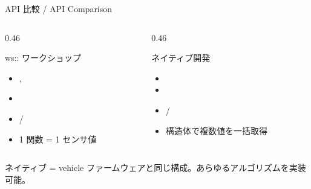 \begin{frame}[fragile]{API 比較 / API Comparison}
  \begin{columns}[t]
    \begin{column}{0.46\textwidth}
      \begin{exampleblock}{ws:: ワークショップ}
        {\scriptsize
        \begin{itemize}
          \item {}, 
          \item {}
          \item {} / 
          \item 1 関数 = 1 センサ値
        \end{itemize}
        }
      \end{exampleblock}
    \end{column}
    \begin{column}{0.46\textwidth}
      \begin{block}{ネイティブ開発}
        {\scriptsize
        \begin{itemize}
          \item {}
          \item {}
          \item {} / 
          \item 構造体で複数値を一括取得
        \end{itemize}
        }
      \end{block}
    \end{column}
  \end{columns}

  \vspace{0.5em}
  {\footnotesize
    ネイティブ = vehicle ファームウェアと同じ構成。あらゆるアルゴリズムを実装可能。
  }
\end{frame}

